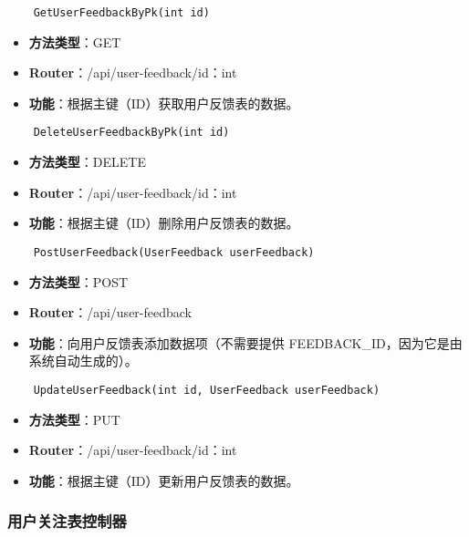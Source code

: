 \begin{verbatim}
	GetUserFeedbackByPk(int id)
\end{verbatim}

\begin{itemize}
	\item \textbf{方法类型}：GET
	\item \textbf{Router}：/api/user-feedback/{id：int}
	\item \textbf{功能}：根据主键（ID）获取用户反馈表的数据。
\end{itemize}

\begin{verbatim}
	DeleteUserFeedbackByPk(int id)
\end{verbatim}

\begin{itemize}
	\item \textbf{方法类型}：DELETE
	\item \textbf{Router}：/api/user-feedback/{id：int}
	\item \textbf{功能}：根据主键（ID）删除用户反馈表的数据。
\end{itemize}

\begin{verbatim}
	PostUserFeedback(UserFeedback userFeedback)
\end{verbatim}

\begin{itemize}
	\item \textbf{方法类型}：POST
	\item \textbf{Router}：/api/user-feedback
	\item \textbf{功能}：向用户反馈表添加数据项（不需要提供 FEEDBACK\_ID，因为它是由系统自动生成的）。
\end{itemize}

\begin{verbatim}
	UpdateUserFeedback(int id, UserFeedback userFeedback)
\end{verbatim}

\begin{itemize}
	\item \textbf{方法类型}：PUT
	\item \textbf{Router}：/api/user-feedback/{id：int}
	\item \textbf{功能}：根据主键（ID）更新用户反馈表的数据。
\end{itemize}

\subsubsection{用户关注表控制器}

